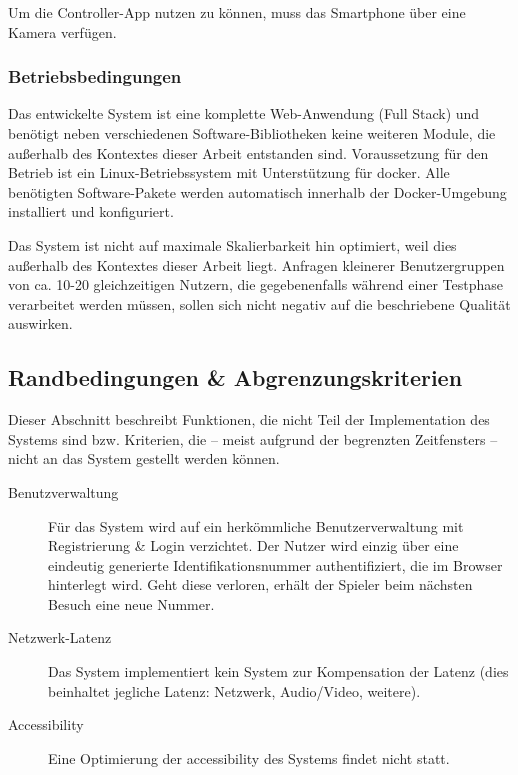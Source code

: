 
Um die Controller-App nutzen zu können, muss das Smartphone über eine
Kamera verfügen.

\subsubsection{Betriebsbedingungen}\label{betriebsbedingungen}

Das entwickelte System ist eine komplette Web-Anwendung (\glqq{}Full
Stack\grqq{}) und benötigt neben verschiedenen Software-Bibliotheken
keine weiteren Module, die außerhalb des Kontextes dieser Arbeit
entstanden
sind.
Voraussetzung für den Betrieb ist ein Linux-Betriebssystem mit
Unterstützung für \gls{docker}. Alle benötigten Software-Pakete werden
automatisch innerhalb der Docker-Umgebung installiert und konfiguriert.

Das System ist nicht auf maximale Skalierbarkeit hin optimiert, weil
dies außerhalb des Kontextes dieser Arbeit liegt. Anfragen kleinerer
Benutzergruppen von ca. 10-20 gleichzeitigen Nutzern, die gegebenenfalls
während einer Testphase verarbeitet werden müssen, sollen sich nicht
negativ auf die beschriebene Qualität auswirken.

\subsection{Randbedingungen \&
Abgrenzungskriterien}\label{randbedingungen-abgrenzungskriterien}

Dieser Abschnitt beschreibt Funktionen, die nicht Teil der
Implementation des Systems sind bzw. Kriterien, die -- meist aufgrund
der begrenzten Zeitfensters -- nicht an das System gestellt werden
können.

\begin{description}
    \item [Benutzverwaltung] Für das System wird auf ein herkömmliche Benutzerverwaltung mit Registrierung \& Login verzichtet. Der Nutzer wird einzig über eine eindeutig generierte Identifikationsnummer authentifiziert, die im Browser hinterlegt wird. Geht diese verloren, erhält der Spieler beim nächsten Besuch eine neue Nummer.
    \item [Netzwerk-Latenz] Das System implementiert kein System zur Kompensation der Latenz (dies beinhaltet jegliche Latenz: Netzwerk, Audio/Video, weitere).
    \item [Accessibility] Eine Optimierung der \gls{accessibility} des Systems findet nicht statt.
\end{description}
